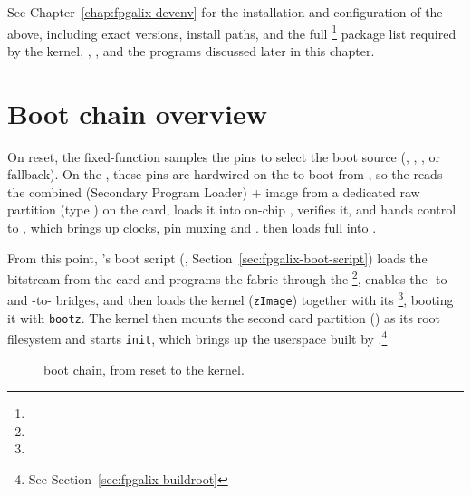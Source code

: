 See Chapter~\ref{chap:fpgalix-devenv} for the installation and configuration of the above, including exact versions, install paths, and the full \footnote{} package list required by the kernel, , , and the programs discussed later in this chapter.

\section{Boot chain overview}
\label{sec:fpgalix-introduction}

On reset, the fixed-function  samples the  pins to select the boot source (, , , or  fallback). On the , these pins are hardwired on the  to boot from  \cite{DE1-SCH}, so the  reads the combined  (Secondary Program Loader) +  image from a dedicated raw partition (type ) on the  card, loads it into on-chip , verifies it, and hands control to , which brings up clocks, pin muxing and  \cite{CV-TRM}.  then loads full  into .

From this point, 's boot script (, Section~\ref{sec:fpgalix-boot-script}) loads the  bitstream from the  card and programs the  fabric through the  \footnote{}, enables the -to- and -to- bridges, and then loads the  kernel (\texttt{zImage}) together with its \footnote{}, booting it with \texttt{bootz}. The kernel then mounts the second  card partition () as its root filesystem and starts \texttt{init}, which brings up the userspace built by .\footnote{See Section~\ref{sec:fpgalix-buildroot}}

\begin{figure}[htbp]
    \centering
    
    \caption{ boot chain, from reset to the  kernel.}
    \label{fig:fpgalix-boot-chain}
\end{figure}

